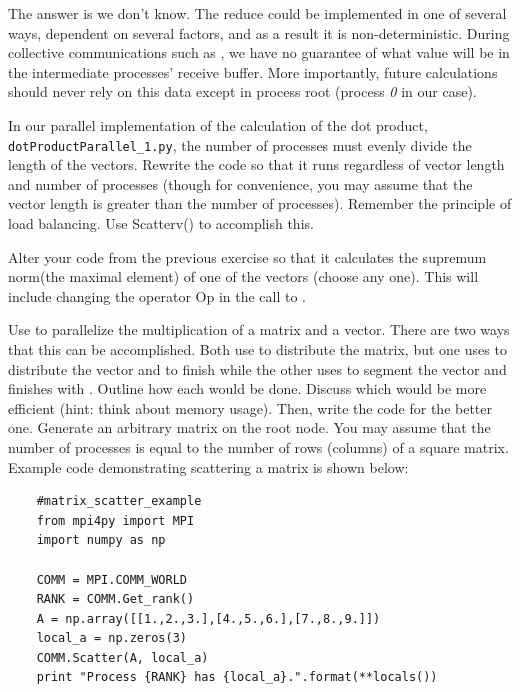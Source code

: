   The answer is we don't know. The reduce could be implemented in one of several ways, dependent on several factors, and as a result it is non-deterministic. During collective communications such as , we have no guarantee of what value will be in the intermediate processes' receive buffer. More importantly, future calculations should never rely on this data except in process root (process \emph{0} in our case).


\begin{problem}
  In our parallel implementation of the calculation of the dot product, \texttt{dotProductParallel\_1.py}, the number of processes must evenly divide the length of the vectors. Rewrite the code so that it runs regardless of vector length and number of processes (though for convenience, you may assume that the vector length is greater than the number of processes). Remember the principle of load balancing. Use Scatterv() to accomplish this.


\end{problem}

\begin{problem}
  Alter your code from the previous exercise so that it calculates the supremum norm(the maximal element) of one of the vectors (choose any one). This will include changing the operator Op in the call to .
\end{problem}

\begin{problem}
  Use  to parallelize the multiplication of a matrix and a vector. There are two ways that this can be accomplished. Both use  to distribute the matrix, but one uses  to distribute the vector and  to finish while the other uses  to segment the vector and finishes with . Outline how each would be done. Discuss which would be more efficient (hint: think about memory usage). Then, write the code for the better one. Generate an arbitrary matrix on the root node. You may assume that the number of processes is equal to the number of rows (columns) of a square matrix. Example code demonstrating scattering a matrix is shown below:

  \begin{lstlisting}
    #matrix_scatter_example
    from mpi4py import MPI
    import numpy as np

    COMM = MPI.COMM_WORLD
    RANK = COMM.Get_rank()
    A = np.array([[1.,2.,3.],[4.,5.,6.],[7.,8.,9.]])
    local_a = np.zeros(3)
    COMM.Scatter(A, local_a)
    print "Process {RANK} has {local_a}.".format(**locals())
  \end{lstlisting}
\end{problem}


